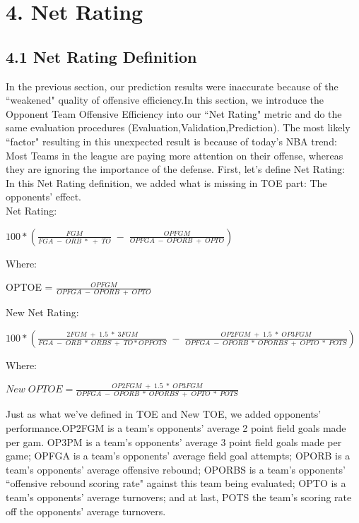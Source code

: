 \documentclass[11pt]{article}
\begin{document}
\section*{4. Net Rating}
\subsection*{4.1 Net Rating Definition}
In the previous section, our prediction results were inaccurate because of the ``weakened" quality of offensive efficiency.In this section, we introduce the Opponent Team Offensive Efficiency into our ``Net Rating" metric and do the same evaluation procedures (Evaluation,Validation,Prediction).
The most likely ``factor" resulting in this unexpected result is because of today's NBA trend: Most Teams in the league are paying more attention on their offense, whereas they are ignoring the importance of the defense.
First, let's define Net Rating:\\

In this Net Rating definition, we added what is missing in TOE part: The opponents' effect.\\
Net Rating:
\begin{center}
$100*(\frac{FGM}{FGA\;-\;ORB\;*\;+\;TO}\;-\;\frac{OPFGM}{OPFGA\;-\;OPORB\;+\;OPTO})$\\
\end{center}
Where:
\begin{center}
OPTOE = $\frac{OPFGM}{OPFGA\;-\;OPORB\;+\;OPTO}$\\
\end{center}
New Net Rating:
\begin{center}
$100*(\frac{2FGM\;+\;1.5\;*\;3FGM}{FGA\;-\;ORB\;*\;ORBS\;+\;TO*OPPOTS}\;-\;\frac{OP2FGM\;+\;1.5\;*\;OP3FGM}{OPFGA\;-\;OPORB\;*\;OPORBS\;+\;OPTO\;*\;POTS})$\\
\end{center}
Where:\\
\begin{center}
$New\;OPTOE = \frac{OP2FGM\;+\;1.5\;*\;OP3FGM}{OPFGA\;-\;OPORB\;*
\;OPORBS\;+\;OPTO\;*\;POTS}$\\
\end{center}

Just as what we've defined in TOE and New TOE, we added opponents' performance.OP2FGM is a team's opponents' average 2 point field goals made per gam. OP3PM is a team's opponents' average 3 point field goals made per game; OPFGA is a team's opponents' average field goal attempts; OPORB is a team's opponents' average offensive rebound; OPORBS is a team's opponents' ``offensive rebound scoring rate" against this team being evaluated; OPTO is a team's opponents' average turnovers; and at last, POTS the team's scoring rate off the opponents' average turnovers.
\end{document}
